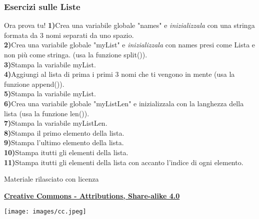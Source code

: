 \documentclass{beamer}
\begin{document}
\begin{frame}[fragile]
\frametitle{Esercizi sulle Liste}
\begin{block}{Ora prova tu!}
  \textbf{1)}Crea una variabile globale "names" e \textit{inizializzala} con una stringa formata da 3 nomi separati da uno spazio. \\
	\textbf{2)}Crea una variabile globale "myList" e \textit{inizializzala} con names presi come Lista e non più come stringa. (usa la funzione split()). \\
  \textbf{3)}Stampa la variabile myList. \\
	\textbf{4)}Aggiungi al lista di prima i primi 3 nomi che ti vengono in mente (usa la funzione append()).\\
  \textbf{5)}Stampa la variabile myList. \\
	\textbf{6)}Crea una variabile globale "myListLen" e inizializzala con la langhezza della lista (usa la funzione len()). \\
  \textbf{7)}Stampa la variabile myListLen.\\
  \textbf{8)}Stampa il primo elemento della lista.\\
  \textbf{9)}Stampa l'ultimo elemento della lista.\\
  \textbf{10)}Stampa itutti gli elementi della lista.\\
  \textbf{11)}Stampa itutti gli elementi della lista con accanto l'indice di ogni elemento.\\

\end{block}
\end{frame}


\begin{frame}

\begin{center}
	\bigskip
	Materiale rilasciato con licenza

	\textbf{\href{http://creativecommons.org/licenses/by-sa/4.0/}{Creative Commons - Attributions, Share-alike 4.0}}

	\medskip
	\texttt{[image: images/cc.jpeg]}
\end{center}

\end{frame}
\end{document}
